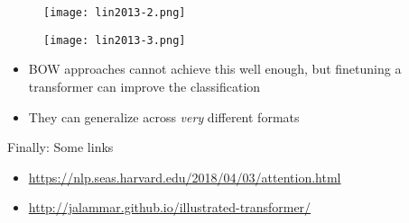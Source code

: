 \begin{frame}[plain]
\begin{figure}
	\centering
	\texttt{[image: lin2013-2.png]}
\end{figure}
\end{frame}


\begin{frame}[plain]
\begin{figure}
	\centering
	\texttt{[image: lin2013-3.png]}
\end{figure}
\end{frame}


\begin{frame}{\textcite{Lin2023}}
  \begin{itemize}
  \item BOW approaches cannot achieve this well enough, but finetuning a transformer can improve the classification
  \item They can generalize across \emph{very} different formats
  \end{itemize}

\end{frame}





\begin{frame}{Finally: Some links}
\begin{itemize}
\item \url{https://nlp.seas.harvard.edu/2018/04/03/attention.html}
\item \url{http://jalammar.github.io/illustrated-transformer/}
\end{itemize}
\end{frame}



